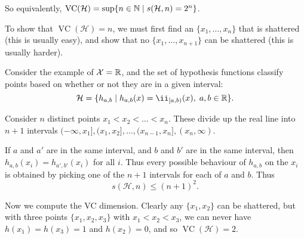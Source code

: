 \documentclass[a4paper]{amsart}
\begin{document}
So equivalently, $\operatorname{VC}(\mathcal{H}) = \sup\{ n \in \mathbb{N} \mid s(\mathcal{H}, n) = 2^n\}$.

To show that $\operatorname{VC}(\mathcal{H}) = n$, we must first find an $\{x_1, \dots, x_n\}$ that is shattered (this is usually easy), and show that no $\{x_1, \dots, x_{n + 1}\}$ can be shattered (this is usually harder).

\begin{example}
Consider the example of $\mathcal{X} = \mathbb{R}$, and the set of hypothesis functions classify points based on whether or not they are in a given interval:
$$
\mathcal{H} = \{h_{a, b} \mid h_{a, b}(x) = \ii_{[a, b)}(x), \; a, b \in \R\}.
$$

Consider $n$ distinct points $x_1 < x_2 < \dots < x_n$. These divide up the real line into $n + 1$ intervals $(-\infty, x_1], (x_1, x_2], \dots, (x_{n - 1}, x_n], (x_n, \infty)$. 

If $a$ and $a'$ are in the same interval, and $b$ and $b'$ are in the same interval, then $h_{a, b}(x_i) = h_{a', b'}(x_i)$ for all $i$. Thus every possible behaviour of $h_{a, b}$ on the $x_i$ is obtained by picking one of the $n + 1$ intervals for each of $a$ and $b$. Thus
$$
s(\mathcal{H}, n) \leq (n + 1)^2.
$$

Now we compute the VC dimension. Clearly any $\{x_1, x_2\}$ can be shattered, but with three points $\{x_1, x_2, x_3\}$ with $x_1 < x_2 < x_3$, we can never have $h(x_1) = h(x_3) = 1$ and $h(x_2) = 0$, and so $\operatorname{VC}(\mathcal{H}) = 2$.
\end{example}
\end{document}
